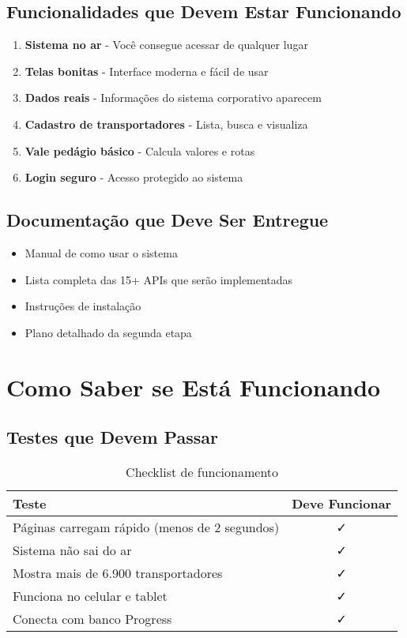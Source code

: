 \documentclass[12pt,a4paper]{article}
\begin{document}
\subsection{Funcionalidades que Devem Estar Funcionando}
\begin{enumerate}
    \item \textbf{Sistema no ar} - Você consegue acessar de qualquer lugar
    \item \textbf{Telas bonitas} - Interface moderna e fácil de usar
    \item \textbf{Dados reais} - Informações do sistema corporativo aparecem
    \item \textbf{Cadastro de transportadores} - Lista, busca e visualiza
    \item \textbf{Vale pedágio básico} - Calcula valores e rotas
    \item \textbf{Login seguro} - Acesso protegido ao sistema
\end{enumerate}

\subsection{Documentação que Deve Ser Entregue}
\begin{itemize}
    \item Manual de como usar o sistema
    \item Lista completa das 15+ APIs que serão implementadas
    \item Instruções de instalação
    \item Plano detalhado da segunda etapa
\end{itemize}

\section{Como Saber se Está Funcionando}

\subsection{Testes que Devem Passar}
\begin{table}[H]
    \centering
    \begin{tabularx}{\textwidth}{|X|c|}
        \hline
        \textbf{Teste} & \textbf{Deve Funcionar} \\
        \hline
        Páginas carregam rápido (menos de 2 segundos) & ✓ \\
        Sistema não sai do ar & ✓ \\
        Mostra mais de 6.900 transportadores & ✓ \\
        Funciona no celular e tablet & ✓ \\
        Conecta com banco Progress & ✓ \\
        \hline
    \end{tabularx}
    \caption{Checklist de funcionamento}
\end{table}
\end{document}
